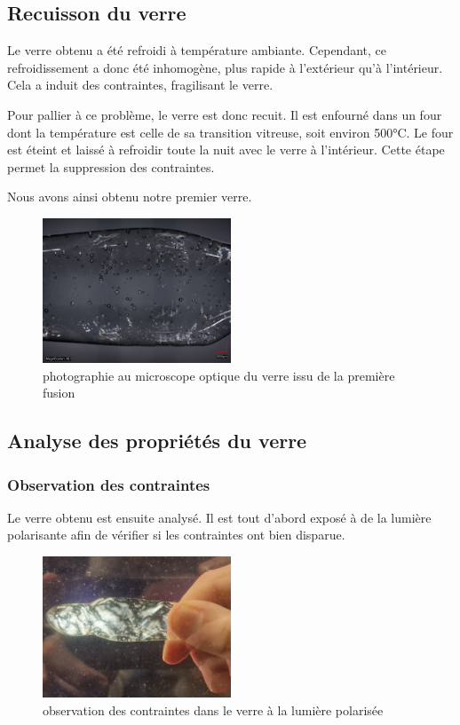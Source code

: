 \documentclass{article}
\begin{document}
\subsection{Recuisson du verre}

Le verre obtenu a été refroidi à température ambiante. Cependant, ce refroidissement a donc été inhomogène, plus rapide à l'extérieur qu'à l'intérieur. Cela a induit des contraintes, fragilisant le verre.

Pour pallier à ce problème, le verre est donc recuit. Il est enfourné dans un four dont la température est celle de sa transition vitreuse, soit environ 500°C. Le four est éteint et laissé à refroidir toute la nuit avec le verre à l'intérieur.
Cette étape permet la suppression des contraintes.

Nous avons ainsi obtenu notre premier verre.

\begin{figure}[h]
    \centering
    \includegraphics[width=0.5\textwidth]{photos/mosaic.jpg}
    \caption{photographie au microscope optique du verre issu de la première fusion}
\end{figure}

\subsection{Analyse des propriétés du verre}

\subsubsection{Observation des contraintes}
Le verre obtenu est ensuite analysé. Il est tout d'abord exposé à de la lumière polarisante afin de vérifier si les contraintes ont bien disparue.

\begin{figure}[h]
    \centering
    \includegraphics[width=0.5\textwidth]{photos/contraintes.jpg}
    \caption{observation des contraintes dans le verre à la lumière polarisée}
\end{figure}
\end{document}
